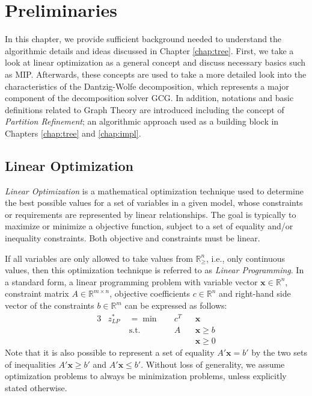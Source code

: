 \chapter{Preliminaries}

	In this chapter, we provide sufficient background needed to understand the algorithmic details and ideas discussed in Chapter \ref{chap:tree}.
	First, we take a look at linear optimization as a general concept and discuss necessary basics such as \ac{MIP}.
	Afterwards, these concepts are used to take a more detailed look into the characteristics of the Dantzig-Wolfe decomposition, which represents a major component of the decomposition solver \acs{GCG}.
	In addition, notations and basic definitions related to Graph Theory are introduced including the concept of \textit{Partition Refinement}; an algorithmic approach used as a building block in Chapters \ref{chap:tree} and \ref{chap:impl}.

	\section{Linear Optimization}
	
		\textit{Linear Optimization} is a mathematical optimization technique used to determine the best possible values for a set of variables in a given model, whose constraints or requirements are represented by linear relationships. The goal is typically to maximize or minimize a objective function, subject to a set of equality and/or inequality constraints. Both objective and constraints must be linear.
		
		If all variables are only allowed to take values from $\mathbb{R}^n_{\geq}$, i.e., only continuous values, then this optimization technique is referred to as \textit{Linear Programming}.
		In a standard form, a linear programming problem with variable vector $\mathbf{x} \in \mathbb{R}^n$, constraint matrix $A \in \mathbb{R}^{m \times n}$, objective coefficients $c \in \mathbb{R}^n$ and right-hand side vector of the constraints $b \in \mathbb{R}^m$ can be expressed as follows:
		\begin{alignat*}{3}
			&z^*_{LP} \; &={}	\min	&\quad  c^T && \mathbf{x} \\
			&				  		& \text{s.t.} & \quad A && \mathbf{x} \geq b \\
			&						&					 &					&& \mathbf{x} \geq 0
		\end{alignat*}
		Note that it is also possible to represent a set of equality $A' \mathbf{x} = b'$ by the two sets of inequalities $A' \mathbf{x} \geq b'$ and $A' \mathbf{x} \leq b'$.
		Without loss of generality, we assume optimization problems to always be minimization problems, unless explicitly stated otherwise.
		
